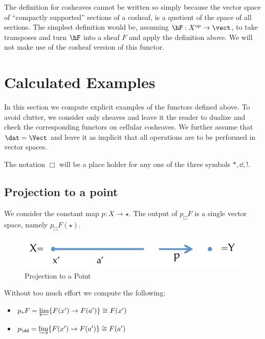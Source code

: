 \begin{rmk}
	The definition for cosheaves cannot be written so simply because the vector space of ``compactly supported'' sections of a cosheaf, is a quotient of the space of all sections. The simplest definition would be, assuming $\hF:X^{op}\to\vect$, to take transposes and turn $\hF$ into a sheaf $F$ and apply the definition above. We will not make use of the cosheaf version of this functor.
\end{rmk}

\section{Calculated Examples}\label{subsec:calculated_examples}
In this section we compute explicit examples of the functors defined above. To avoid clutter, we consider only sheaves and leave it the reader to dualize and check the corresponding functors on cellular cosheaves. We further assume that $\dat=\Vect$ and leave it as implicit that all operations are to be performed in vector spaces. 

The notation $\Box$ will be a place holder for any one of the three symbols $*,\dd,!$.

\subsection{Projection to a point}
We consider the constant map $p:X\to\star$. The output of $p_{\Box}F$ is a single vector space, namely $p_{\Box}F(\star)$. 

\begin{figure}[!ht]
\centering
\includegraphics[width=.7\textwidth]{shv_fun_ex1p.pdf}
\caption{Projection to a Point}
\label{fig:shv_fun_ex1}
\end{figure}

Without too much effort we compute the following:
\begin{itemize}
 \item $p_*F=\varprojlim\{F(x')\to F(a')\}\cong F(x')$
 \item $p_{\dd}=\varinjlim\{F(x')\to F(a')\}\cong F(a')$
\end{itemize}

